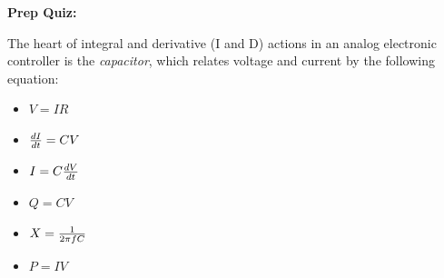 \vfil \eject

\noindent
{\bf Prep Quiz:}

The heart of integral and derivative (I and D) actions in an analog electronic controller is the {\it capacitor}, which relates voltage and current by the following equation:

\begin{itemize}
\item{} $V = IR$
\vskip 10pt
\item{} ${dI \over dt} = CV$
\vskip 10pt
\item{} $I = C{dV \over dt}$
\vskip 10pt
\item{} $Q = CV$
\vskip 10pt
\item{} $X = {1 \over 2\pi fC}$
\vskip 10pt
\item{} $P = IV$
\end{itemize}






